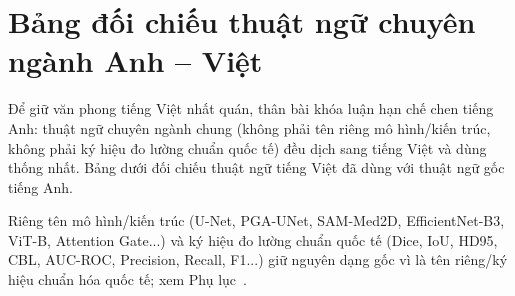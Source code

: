 \chapter*{Bảng đối chiếu thuật ngữ chuyên ngành Anh -- Việt}
\label{doichieuthuatngu}

Để giữ văn phong tiếng Việt nhất quán, thân bài khóa luận hạn chế chen tiếng Anh: thuật ngữ chuyên ngành chung (không phải tên riêng mô hình/kiến trúc, không phải ký hiệu đo lường chuẩn quốc tế) đều dịch sang tiếng Việt và dùng thống nhất. Bảng dưới đối chiếu thuật ngữ tiếng Việt đã dùng với thuật ngữ gốc tiếng Anh.

Riêng tên mô hình/kiến trúc (U-Net, PGA-UNet, SAM-Med2D, EfficientNet-B3, ViT-B, Attention Gate...) và ký hiệu đo lường chuẩn quốc tế (Dice, IoU, HD95, CBL, AUC-ROC, Precision, Recall, F1...) giữ nguyên dạng gốc vì là tên riêng/ký hiệu chuẩn hóa quốc tế; xem Phụ lục~.

